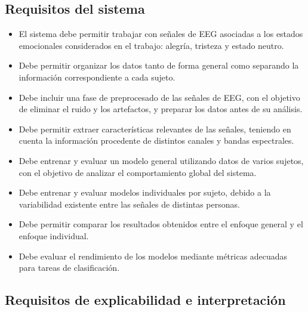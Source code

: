 \subsection*{Requisitos del sistema}

\begin{itemize}
    \item El sistema debe permitir trabajar con señales de \ac{EEG} asociadas a los estados emocionales considerados en el trabajo: alegría, tristeza y estado neutro.

    \item Debe permitir organizar los datos tanto de forma general como separando la información correspondiente a cada sujeto.

    \item Debe incluir una fase de preprocesado de las señales de \ac{EEG}, con el objetivo de eliminar el ruido y los artefactos, y preparar los datos antes de su análisis.

    \item Debe permitir extraer características relevantes de las señales, teniendo en cuenta la información procedente de distintos canales y bandas espectrales.

    \item Debe entrenar y evaluar un modelo general utilizando datos de varios sujetos, con el objetivo de analizar el comportamiento global del sistema.

    \item Debe entrenar y evaluar modelos individuales por sujeto, debido a la variabilidad existente entre las señales de distintas personas.

    \item Debe permitir comparar los resultados obtenidos entre el enfoque general y el enfoque individual.

    \item Debe evaluar el rendimiento de los modelos mediante métricas adecuadas para tareas de clasificación.
\end{itemize}

\subsection*{Requisitos de explicabilidad e interpretación}

